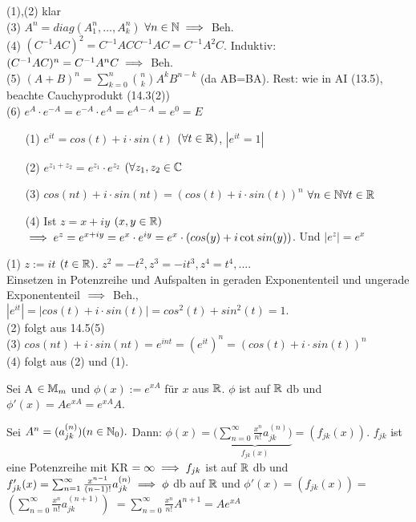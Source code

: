 \documentclass{article}
\begin{document}
\begin{beweis}
(1),(2) klar \\
(3) $A^n = diag(A_1^n,...,A_k^n)$ $\forall n \in \mathbb{N} \implies$ Beh. \\
(4) $(C^{-1}AC)^2 = C^{-1}ACC^{-1}AC = C^{-1}A^2C$.  Induktiv: $(C^{-1}AC)^n = C^{-1}A^nC \implies$ Beh. \\
(5) $(A+B)^n = \sum_{k=0}^{n} \binom{n}{k}A^kB^{n-k}$ (da AB=BA). Rest: wie in AI (13.5), beachte Cauchyprodukt (14.3(2)) \\
(6) $e^A\cdot e^{-A} = e^{-A}\cdot e^{A} = e^{A-A} = e^0 = E$
\end{beweis}


\begin{folgerung}
\begin{itemize}
\item[(1)] $e^{it} = cos(t) + i \cdot sin(t)$ $(\forall t \in \mathbb{R})$, $| e^{it} = 1 |$ 
\item[(2)] $e^{z_1 + z_2} = e^{z_1}\cdot e^{z_2}$ $(\forall z_1,z_2 \in \mathbb{C}$ 
\item[(3)] $cos(nt) + i \cdot sin(nt) = (cos(t) + i \cdot sin(t))^n $ $\forall n \in \mathbb{N} \forall t \in \mathbb{R}$ 
\item[(4)] Ist $z = x+ iy$ $(x,y \in \mathbb{R})$ $\implies e^{z} = e^{x+iy} = e^x \cdot e^{iy} = e^x \cdot (cos(y) + i\cot sin(y))$. Und $|e^z|=e^x$
\end{itemize}
\end{folgerung}

\begin{beweis}
(1) $z := it$ $(t \in \mathbb{R})$. $z^2 = -t^2, z^3 = -it^3, z^4=t^4,... .$ \\
Einsetzen in Potenzreihe und Aufspalten in geraden Exponententeil und ungerade Exponententeil $\implies$ Beh., $|e^{it}|= |cos(t)+i\cdot sin(t)| = cos^2(t)+sin^2(t) = 1.$ \\
(2) folgt aus 14.5(5) \\
(3) $cos(nt)+i \cdot sin(nt) = e^{int} = (e^{it})^n = (cos(t) + i\cdot sin(t))^n$ \\
(4) folgt aus (2) und (1).
\end{beweis}

\begin{satz}
Sei A $\in \mathbb{M}_m$ und $\phi(x):=e^{xA}$ für $x$ aus $\mathbb{R}$. $\phi$ ist auf $\mathbb{R}$ db und 
$\phi'(x) = Ae^{xA}=e^{xA}A$.
\end{satz}

\begin{beweis}
Sei $A^n = (a_{jk}^{(n)}) (n\in \mathbb{N}_0). $ Dann: 
$\phi(x) = (\underbrace{\sum_{n=0}^{\infty}\frac{x^n}{n!}a_{jk}^{(n)})}_{f_{jk}(x)} = (f_{jk}(x))$. $f_{jk}$ ist eine Potenzreihe mit KR $=\infty \implies f_{jk}$ ist auf $\mathbb{R}$ db und
$f_{jk}'(x) = \sum_{n=1}^{\infty}\frac{x^{n-1}}{(n-1)!}a_{jk}^{(n)} \implies \phi$ db auf $\mathbb{R}$
und $\phi'(x) = (f_{jk}(x)) = $
$(\sum_{n=0}^{\infty}\frac{x^n}{n!}a_{jk}^{(n+1)})$ 
$ = \sum_{n=0}^{\infty} \frac{x^n}{n!} A^{n+1} = Ae^{xA}$
\end{beweis}
\end{document}
